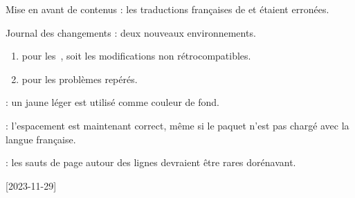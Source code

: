 \begin{tdocfix}
    \item Mise en avant de contenus : les traductions françaises de  et  étaient erronées.
\end{tdocfix}

\tdocsep




\begin{tdocnew}[version = 1.1.0, date = 2024-01-06]
    \item Journal des changements : deux nouveaux environnements.
    \begin{enumerate}
        \item {} pour les \,, soit les modifications non rétrocompatibles.

        \item {} pour les problèmes repérés.
    \end{enumerate}

    \item {}: un jaune léger est utilisé comme couleur de fond.
\end{tdocnew}

\tdocsep




\begin{tdocfix}[version = 1.0.1, date = 2023-12-08]
    \item {}: l'espacement est maintenant correct, même si le paquet  n'est pas chargé avec la langue française.

    \item {}: les sauts de page autour des lignes  devraient être rares dorénavant.
\end{tdocfix}

\tdocsep




[2023-11-29]


